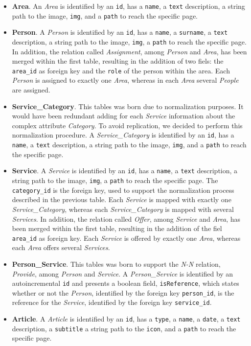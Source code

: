 \documentclass[12pt]{report}
\begin{document}
\begin{itemize}
	\item \textbf{Area}. An \emph{Area} is identified by an \texttt{id}, 
	has a \texttt{name}, a \texttt{text} description, a string path to the image, 
	\texttt{img}, and a \texttt{path} to reach the specific page. 
	\item \textbf{Person}. A \emph{Person} is identified by an \texttt{id}, 
	has a \texttt{name}, a \texttt{surname}, a \texttt{text} description, a 
	string path to the image, \texttt{img}, a \texttt{path} to reach the specific page.
	In addition, the relation called \emph{Assignment}, among \emph{Person} and \emph{Area}, has
	been merged within the first table, resulting in the addition of two fiels: the 
	\texttt{area\_id} as foreign key and the \texttt{role} of the person within the area.
	Each \emph{Person} is assigned to exactly one \emph{Area}, whereas in each \emph{Area} several
	\emph{People} are assigned.
	\item \textbf{Service\_Category}. This tables was born due to normalization purposes. 
	It would have been redundant adding for each \emph{Service} information about the complex 
	attribute \emph{Category}. To avoid replication, we decided to perform this normalization 
	procedure. A \emph{Service\_Category} is identified by an \texttt{id}, 
	has a \texttt{name}, a \texttt{text} description, a string path to the image, 
	\texttt{img}, and a \texttt{path} to reach the specific page. 
	\item \textbf{Service}. A \emph{Service} is identified by an \texttt{id}, 
	has a \texttt{name}, a \texttt{text} description, a string path to the image, \texttt{img}, 
	a \texttt{path} to reach the specific page.
	The \texttt{category\_id} is the foreign key, used to support the normalization process 
	described in the previous table. 
	Each \emph{Service} is mapped with exactly one \emph{Service\_Category}, whereas each 
	\emph{Service\_Category} is mapped with several \emph{Services}.
	In addition, the relation called \emph{Offer}, among 
	\emph{Service} and \emph{Area}, has	been merged within the first table, resulting in 
	the addition of the fiel \texttt{area\_id} as foreign key.
	Each \emph{Service} is offered by exactly one \emph{Area}, whereas each \emph{Area} offers 
	several \emph{Services}.
	\item \textbf{Person\_Service}. This tables was born to support the \emph{N-N} relation, 
	\emph{Provide}, among \emph{Person} and \emph{Service}. A \emph{Person\_Service} is 
	identified by an autoincremental \texttt{id} and presents a boolean field, \texttt{isReference}, 
	which states whether or not the \emph{Person}, identified by the foreign key \texttt{person\_id}, 
	is the reference for the \emph{Service}, identified by the foreign key \texttt{service\_id}.
	\item \textbf{Article}. A \emph{Article} is identified by an \texttt{id}, has a 
	\texttt{type}, a \texttt{name}, a \texttt{date}, a \texttt{text} description, a \texttt{subtitle} 
	a string path to the \texttt{icon}, and a \texttt{path} to reach the specific page. 
\end{itemize}
\end{document}
